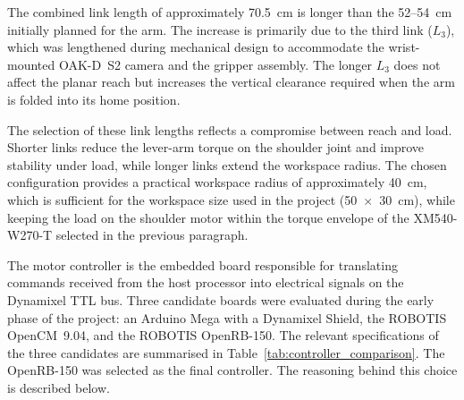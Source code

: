 The combined link length of approximately 70.5~cm is longer than 
the 52--54~cm initially planned for the arm. The increase is 
primarily due to the third link ($L_3$), which was lengthened 
during mechanical design to accommodate the wrist-mounted OAK-D~S2 
camera and the gripper assembly. The longer $L_3$ does not affect 
the planar reach but increases the vertical clearance required 
when the arm is folded into its home position.

The selection of these link lengths reflects a compromise between 
reach and load. Shorter links reduce the lever-arm torque on the 
shoulder joint and improve stability under load, while longer 
links extend the workspace radius. The chosen configuration 
provides a practical workspace radius of approximately 40~cm, 
which is sufficient for the workspace size used in the project 
(50~$\times$~30~cm), while keeping the load on the shoulder 
motor within the torque envelope of the XM540-W270-T selected in 
the previous paragraph.

\label{sec:controller-selection}

The motor controller is the embedded board responsible for 
translating commands received from the host processor into 
electrical signals on the Dynamixel TTL bus. Three candidate 
boards were evaluated during the early phase of the project: an 
Arduino Mega with a Dynamixel Shield, the ROBOTIS OpenCM~9.04, 
and the ROBOTIS OpenRB-150. The relevant specifications of the 
three candidates are summarised in Table~\ref{tab:controller_comparison}. 
The OpenRB-150 was selected as the final controller. The reasoning 
behind this choice is described below.

